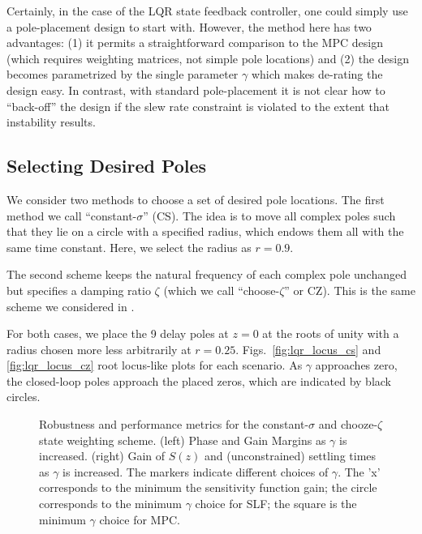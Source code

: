\documentclass[journal,twocolumn,twoside]{IEEEtran}
\begin{document}
Certainly, in the case of the LQR state feedback controller, one could simply use a pole-placement design to start with. However, the method here has two advantages: (1) it permits a straightforward comparison to the MPC design (which requires weighting matrices, not simple pole locations) and (2) the design becomes parametrized by the single parameter $\gamma$ which makes de-rating the design easy. In contrast, with standard pole-placement it is not clear how to ``back-off'' the design if the slew rate constraint is violated to the extent that instability results. 


\subsection{Selecting Desired Poles}
We consider two methods to choose a set of desired pole locations. The first method we call ``constant-$\sigma$'' (CS). The idea is to move all complex poles such that they lie on a circle with a specified radius, which endows them all with the same time constant. Here, we select the radius as $r=0.9$.

The second scheme keeps the natural frequency of each complex pole unchanged but specifies a damping ratio $\zeta$ (which we call ``choose-$\zeta$'' or CZ). This is the same scheme we considered in \cite{braker_fast_2017, braker_application_2017}.

For both cases, we place the 9 delay poles at $z=0$ at the roots of unity with a radius chosen more less arbitrarily at $r=0.25$. Figs.~\ref{fig:lqr_locus_cs} and \ref{fig:lqr_locus_cz} root locus-like plots for each scenario. As $\gamma$ approaches zero, the closed-loop poles approach the placed zeros, which are indicated by black circles. 

\begin{figure*}
  \begin{subfigure}[t]{0.48\textwidth}
    
    \caption{}
    \label{fig:gmpm}
  \end{subfigure}
  \hfil
  \begin{subfigure}[t]{0.48\textwidth}
    
    \caption{}
    \label{fig:GainS}
  \end{subfigure}
  \caption{Robustness and performance metrics for the constant-$\sigma$ and chooze-$\zeta$ state weighting scheme. (left) Phase and Gain Margins as $\gamma$ is increased. (right) Gain of $S(z)$ and (unconstrained) settling times as $\gamma$ is increased. The markers indicate different choices of $\gamma$. The 'x' corresponds to the minimum the sensitivity function gain; the circle corresponds to the minimum $\gamma$ choice for SLF; the square is the minimum $\gamma$ choice for MPC.}
\end{figure*}
\end{document}
